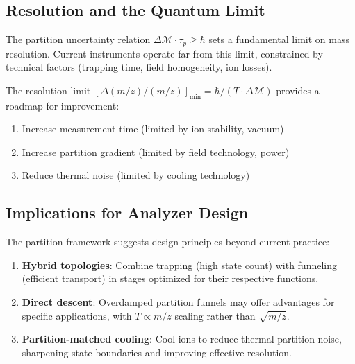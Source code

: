 \documentclass[twocolumn,10pt,a4paper]{article}
\theoremstyle{definition}
\theoremstyle{remark}
\newcommand{\Mdepth}{\mathcal{M}}
\newcommand{\taup}{\tau_p}
\begin{document}
\subsection{Resolution and the Quantum Limit}

The partition uncertainty relation $\Delta\Mdepth \cdot \taup \geq \hbar$ sets a fundamental limit on mass resolution. Current instruments operate far from this limit, constrained by technical factors (trapping time, field homogeneity, ion losses).

The resolution limit $[\Delta(m/z)/(m/z)]_{\min} = \hbar/(T \cdot \Delta\Mdepth)$ provides a roadmap for improvement:
\begin{enumerate}
    \item Increase measurement time (limited by ion stability, vacuum)
    \item Increase partition gradient (limited by field technology, power)
    \item Reduce thermal noise (limited by cooling technology)
\end{enumerate}

\subsection{Implications for Analyzer Design}

The partition framework suggests design principles beyond current practice:

\begin{enumerate}
    \item \textbf{Hybrid topologies}: Combine trapping (high state count) with funneling (efficient transport) in stages optimized for their respective functions.

    \item \textbf{Direct descent}: Overdamped partition funnels may offer advantages for specific applications, with $T \propto m/z$ scaling rather than $\sqrt{m/z}$.

    \item \textbf{Partition-matched cooling}: Cool ions to reduce thermal partition noise, sharpening state boundaries and improving effective resolution.
\end{enumerate}
\end{document}
